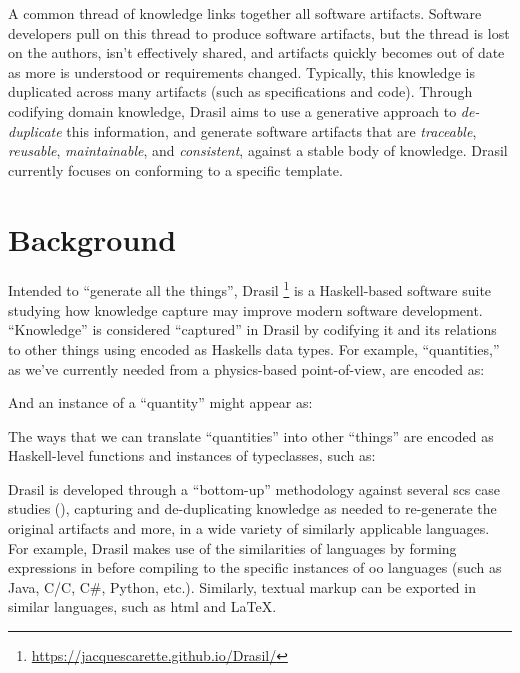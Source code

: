       A common thread of knowledge links together all software artifacts.
      Software developers pull on this thread to produce software artifacts, but
      the thread is lost on the authors, isn't effectively shared, and artifacts
      quickly becomes out of date as more is understood or requirements changed.
      Typically, this knowledge is duplicated across many artifacts (such as
      specifications and code). Through codifying domain knowledge,
      Drasil\cite{Drasil2021} aims to use a generative approach to
      \textit{de-duplicate} this information, and generate software artifacts
      that are \textit{traceable}, \textit{reusable}, \textit{maintainable}, and
      \textit{consistent}, against a stable body of knowledge. Drasil currently
      focuses on  conforming to a specific 
      template\cite{SmithAndLai2005}.
\fi

\section{Background}
\label{sec:intro:background}


Intended to ``generate all the things''\footnotemark{}, Drasil
\footnote{\url{https://jacquescarette.github.io/Drasil/}} is a Haskell-based
\cite{Haskell2010} software suite studying how knowledge capture may improve
modern software development. ``Knowledge'' is considered ``captured'' in Drasil
by codifying it and its relations to other things using  encoded as
Haskells data types. For example, ``quantities,'' as we've currently needed from
a physics-based point-of-view, are encoded as:


And an instance of a ``quantity'' might appear as:


The ways that we can translate ``quantities'' into other ``things'' are encoded
as Haskell-level functions and instances of typeclasses, such as:


Drasil is developed through a ``bottom-up'' methodology against several
\acs{scs} case studies (), capturing and de-duplicating
knowledge as needed to re-generate the original artifacts and more, in a wide
variety of similarly applicable languages. For example, Drasil makes use of the
similarities of  languages by forming expressions in  before
compiling to the specific instances of \acs{oo} languages (such as Java,
C/C\+\+, C\#, Python, etc.). Similarly, textual markup can be exported in
similar languages, such as \acs{html} and \LaTeX{}.

